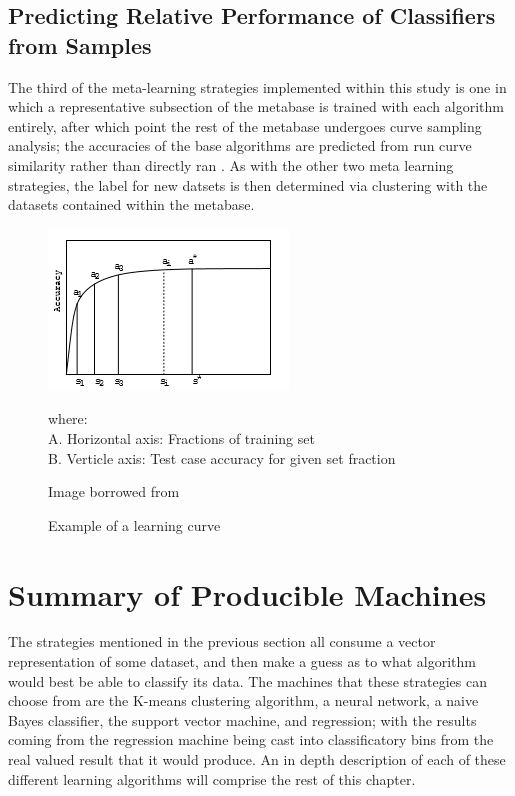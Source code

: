 \subsection{Predicting Relative Performance of Classifiers from Samples}
The third of the meta-learning strategies implemented within this study is one in
which a representative subsection of the metabase is trained with each algorithm
entirely, after which point the rest of the metabase undergoes curve
sampling analysis; the accuracies of the base algorithms are predicted from
run curve similarity rather than directly ran \cite{Leite}.
As with the other two meta learning strategies, the label for new datsets is
then determined via clustering with the datasets contained within the metabase.
\begin{figure}[h]
\includegraphics{Chapters/Images/LearningCurve/LearningCurve.PNG}
\caption{Example of a learning curve}
\centering
\begin{flushleft}
where: \\
A. Horizontal axis: Fractions of training set \\
B. Verticle axis: Test case accuracy for given set fraction \\
\end{flushleft}
Image borrowed from \cite{Leite}
\end{figure}
\section{Summary of Producible Machines}
The strategies mentioned in the previous section all consume a vector
representation of some dataset, and then make a guess as to what algorithm would best
be able to classify its data. The machines that these strategies can choose from are
the K-means clustering algorithm, a neural network, a naive Bayes classifier, the support
vector machine, and regression; with the results coming from the regression
machine being cast into classificatory bins from the real valued result that it
would produce. An in depth description of each of these different learning
algorithms will comprise the rest of this chapter.
